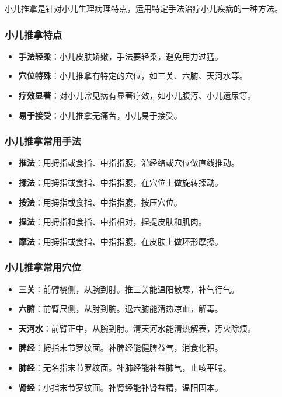 \documentclass[12pt,UTF8]{ctexbook}
\begin{document}
小儿推拿是针对小儿生理病理特点，运用特定手法治疗小儿疾病的一种方法。

\subsubsection{小儿推拿特点}

\begin{itemize}
\item \textbf{手法轻柔}：小儿皮肤娇嫩，手法要轻柔，避免用力过猛。
\item \textbf{穴位特殊}：小儿推拿有特定的穴位，如三关、六腑、天河水等。
\item \textbf{疗效显著}：对小儿常见病有显著疗效，如小儿腹泻、小儿遗尿等。
\item \textbf{易于接受}：小儿推拿无痛苦，小儿易于接受。
\end{itemize}

\subsubsection{小儿推拿常用手法}

\begin{itemize}
\item \textbf{推法}：用拇指或食指、中指指腹，沿经络或穴位做直线推动。
\item \textbf{揉法}：用拇指或食指、中指指腹，在穴位上做旋转揉动。
\item \textbf{按法}：用拇指或食指、中指指腹，按压穴位。
\item \textbf{捏法}：用拇指和食指、中指相对，捏提皮肤和肌肉。
\item \textbf{摩法}：用拇指或食指、中指指腹，在皮肤上做环形摩擦。
\end{itemize}

\subsubsection{小儿推拿常用穴位}

\begin{itemize}
\item \textbf{三关}：前臂桡侧，从腕到肘。推三关能温阳散寒，补气行气。
\item \textbf{六腑}：前臂尺侧，从肘到腕。退六腑能清热凉血，解毒。
\item \textbf{天河水}：前臂正中，从腕到肘。清天河水能清热解表，泻火除烦。
\item \textbf{脾经}：拇指末节罗纹面。补脾经能健脾益气，消食化积。
\item \textbf{肺经}：无名指末节罗纹面。补肺经能补益肺气，止咳平喘。
\item \textbf{肾经}：小指末节罗纹面。补肾经能补肾益精，温阳固本。
\end{itemize}
\end{document}
